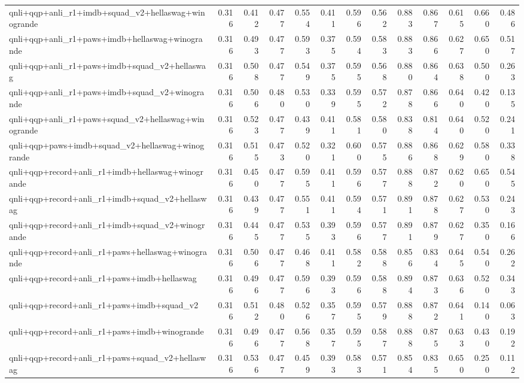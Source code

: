 \begin{table}[t]
\begin{tabular}{lrrrrrrrrrrrr}
    qnli+qqp+anli\_r1+imdb+squad\_v2+hellaswag+winogrande & 0.316 & 0.412 & 0.477 & 0.554 & 0.411 & 0.596 & 0.562 & 0.883 & 0.867 & 0.615 & 0.660 & 0.486 \\
    qnli+qqp+anli\_r1+paws+imdb+hellaswag+winogrande & 0.316 & 0.493 & 0.477 & 0.593 & 0.375 & 0.594 & 0.583 & 0.883 & 0.866 & 0.627 & 0.650 & 0.517 \\
    qnli+qqp+anli\_r1+paws+imdb+squad\_v2+hellaswag & 0.316 & 0.508 & 0.477 & 0.549 & 0.375 & 0.595 & 0.568 & 0.880 & 0.864 & 0.638 & 0.500 & 0.263 \\
    qnli+qqp+anli\_r1+paws+imdb+squad\_v2+winogrande & 0.316 & 0.506 & 0.480 & 0.530 & 0.339 & 0.595 & 0.572 & 0.878 & 0.866 & 0.640 & 0.420 & 0.135 \\
    qnli+qqp+anli\_r1+paws+squad\_v2+hellaswag+winogrande & 0.316 & 0.523 & 0.477 & 0.439 & 0.411 & 0.581 & 0.580 & 0.838 & 0.814 & 0.640 & 0.520 & 0.241 \\
    qnli+qqp+paws+imdb+squad\_v2+hellaswag+winogrande & 0.316 & 0.515 & 0.473 & 0.520 & 0.321 & 0.600 & 0.575 & 0.886 & 0.868 & 0.629 & 0.580 & 0.338 \\
    qnli+qqp+record+anli\_r1+imdb+hellaswag+winogrande & 0.316 & 0.450 & 0.477 & 0.595 & 0.411 & 0.596 & 0.577 & 0.888 & 0.872 & 0.620 & 0.650 & 0.545 \\
    qnli+qqp+record+anli\_r1+imdb+squad\_v2+hellaswag & 0.316 & 0.439 & 0.477 & 0.551 & 0.411 & 0.594 & 0.571 & 0.891 & 0.878 & 0.627 & 0.530 & 0.243 \\
    qnli+qqp+record+anli\_r1+imdb+squad\_v2+winogrande & 0.316 & 0.445 & 0.477 & 0.535 & 0.393 & 0.596 & 0.577 & 0.891 & 0.879 & 0.627 & 0.350 & 0.166 \\
    qnli+qqp+record+anli\_r1+paws+hellaswag+winogrande & 0.316 & 0.506 & 0.477 & 0.468 & 0.411 & 0.582 & 0.588 & 0.856 & 0.834 & 0.645 & 0.540 & 0.262 \\
    qnli+qqp+record+anli\_r1+paws+imdb+hellaswag & 0.316 & 0.496 & 0.477 & 0.596 & 0.393 & 0.596 & 0.588 & 0.894 & 0.873 & 0.636 & 0.520 & 0.343 \\
    qnli+qqp+record+anli\_r1+paws+imdb+squad\_v2 & 0.316 & 0.512 & 0.480 & 0.526 & 0.357 & 0.595 & 0.579 & 0.888 & 0.872 & 0.641 & 0.140 & 0.063 \\
    qnli+qqp+record+anli\_r1+paws+imdb+winogrande & 0.316 & 0.496 & 0.477 & 0.568 & 0.357 & 0.595 & 0.587 & 0.888 & 0.875 & 0.633 & 0.430 & 0.192 \\
    qnli+qqp+record+anli\_r1+paws+squad\_v2+hellaswag & 0.316 & 0.536 & 0.477 & 0.459 & 0.393 & 0.583 & 0.571 & 0.854 & 0.835 & 0.650 & 0.250 & 0.112 \\

\end{tabular}
\end{table}
